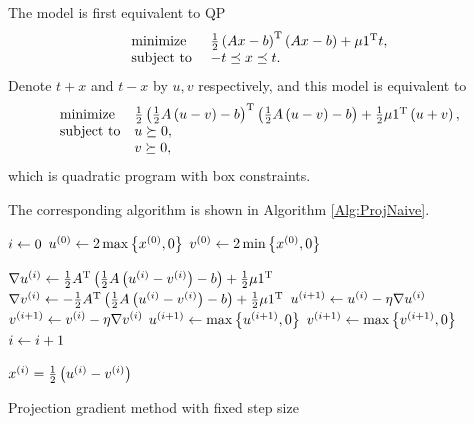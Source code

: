 \documentclass[english]{pkupaper}
\begin{document}
\begin{thmquestion}[3 (a)]
The model is first equivalent to QP
\begin{equation}
\begin{array}{ll}
\mathrel{\text{{minimize}}} & \frac{1}{2} \left(  A x - b  \right)^{\mathrm{T}} \left(  A x - b  \right) + \mu 1^{\mathrm{T}} t, \\
\mathrel{\text{{subject to }}} & -t \preceq x \preceq t.
\end{array}
\end{equation}
Denote $ t + x $ and $ t - x $ by $ u, v $ respectively, and this model is equivalent to
\begin{equation}
\begin{array}{ll}
\mathrel{\text{{minimize}}} & \frac{1}{2} \left(  \frac{1}{2} A \left(  u - v  \right) - b  \right)^{\mathrm{T}} \left(  \frac{1}{2} A \left(  u - v  \right) - b  \right) + \frac{1}{2} \mu 1^{\mathrm{T}} \left(  u + v  \right), \\
\mathrel{\text{{subject to}}} & u \succeq 0, \\
& v \succeq 0,
\end{array}
\end{equation}
which is quadratic program with box constraints.

The corresponding algorithm is shown in Algorithm \ref{Alg:ProjNaive}.

\begin{algorithm}
\SetAlgoLined


$ i \leftarrow 0 $\;
$ u^{\left( 0 \right)} \leftarrow 2 \max \left\{  x^{\left( 0 \right)}, 0  \right\} $\;
$ v^{\left( 0 \right)} \leftarrow 2 \min \left\{  x^{\left( 0 \right)}, 0  \right\} $\;

{
	$ \nabla u^{\left( i \right)} \leftarrow \frac{1}{2} A^{\mathrm{T}} \left(  \frac{1}{2} A \left(  u^{\left( i \right)} - v^{\left( i \right)}  \right) - b  \right) + \frac{1}{2} \mu 1^{\mathrm{T}} $\;
	$ \nabla v^{\left( i \right)} \leftarrow -\frac{1}{2} A^{\mathrm{T}} \left(  \frac{1}{2} A \left(  u^{\left( i \right)} - v^{\left( i \right)}  \right) - b  \right) + \frac{1}{2} \mu 1^{\mathrm{T}} $\;
	$ u^{\left(  i + 1  \right)} \leftarrow u^{\left( i \right)} - \eta \nabla u^{\left( i \right)} $\;
	$ v^{\left(  i + 1  \right)} \leftarrow v^{\left( i \right)} - \eta \nabla v^{\left( i \right)} $\;
	$ u^{\left(  i + 1  \right)} \leftarrow \max \left\{  u^{\left(  i + 1  \right)}, 0  \right\} $\;
	$ v^{\left(  i + 1  \right)} \leftarrow \max \left\{  v^{\left(  i + 1  \right)}, 0  \right\} $\;
	$ i \leftarrow i + 1 $\;
}

$ x^{\left( i \right)} = \frac{1}{2} \left(  u^{\left( i \right)} - v^{\left( i \right)}  \right) $\;

\caption{Projection gradient method with fixed step size} \label{Alg:ProjNaive}
\end{algorithm}


\end{thmquestion}
\end{document}
